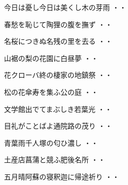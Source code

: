 \vspace{0.6cm}
\begin{shiika}今日は憂し今日は美くし木の芽雨
\hfill{・・}\end{shiika}
\vspace{0.6cm}
\begin{shiika}春愁を恥じて陶狸の腹を撫ず
\hfill{・・}\end{shiika}
\vspace{0.6cm}
\begin{shiika}名桜につきぬ名残の里を去る
\hfill{・・}\end{shiika}
\vspace{0.6cm}
\begin{shiika}山裾の梨の花園に白昼夢
\hfill{・・}\end{shiika}
\vspace{0.6cm}
\begin{shiika}花クローバ終の棲家の地鎮祭
\hfill{・・}\end{shiika}
\vspace{0.6cm}
\begin{shiika}松の花傘寿を集ふ公の庭
\hfill{・・}\end{shiika}
\vspace{0.6cm}
\begin{shiika}文学館出でてまぶしき若葉光
\hfill{・・}\end{shiika}
\vspace{0.6cm}
\begin{shiika}目礼がことばよ通院路の茂り
\hfill{・・}\end{shiika}
\vspace{0.6cm}
\begin{shiika}青葉雨千人塚の匂ひ濃し
\hfill{・・}\end{shiika}
\vspace{0.6cm}
\begin{shiika}土産店菖蒲と競ふ肥後名所
\hfill{・・}\end{shiika}
\vspace{0.6cm}
\begin{shiika}五月晴阿蘇の寝釈迦に帰途祈り
\hfill{・・}\end{shiika}
